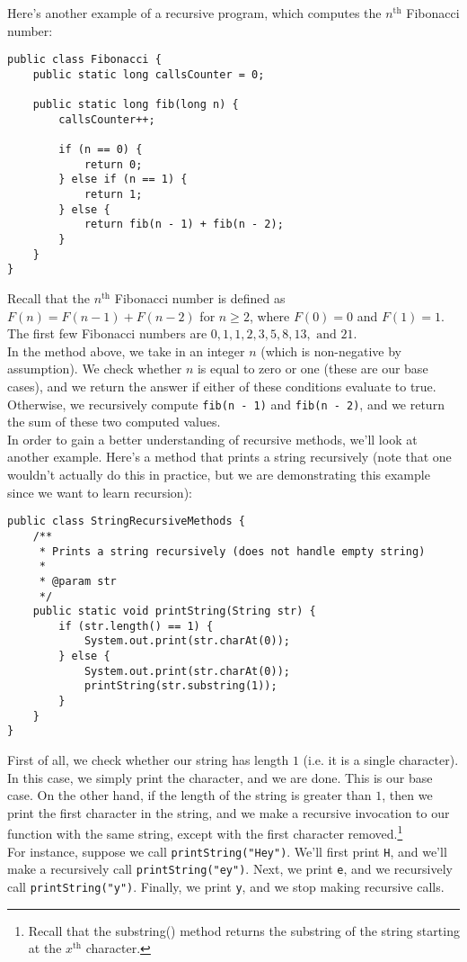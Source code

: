 Here's another example of a recursive program, which computes the $n^{\text{th}}$ Fibonacci number:

\begin{lstlisting}
public class Fibonacci {
	public static long callsCounter = 0;

	public static long fib(long n) {
		callsCounter++;

		if (n == 0) {
			return 0;
		} else if (n == 1) {
			return 1;
		} else {
			return fib(n - 1) + fib(n - 2);
		}
	}
}
\end{lstlisting}

Recall that the $n^{\text{th}}$ Fibonacci number is defined as $F(n) = F(n - 1) + F(n - 2)$ for $n \geq 2$, where $F(0) = 0$ and $F(1) = 1$. The first few Fibonacci numbers are $0, 1, 1, 2, 3, 5, 8, 13, \text{ and } 21$. \\

In the method above, we take in an integer $n$ (which is non-negative by assumption). We check whether $n$ is equal to zero or one (these are our base cases), and we return the answer if either of these conditions evaluate to true. Otherwise, we recursively compute \verb!fib(n - 1)! and \verb!fib(n - 2)!, and we return the sum of these two computed values. \\

In order to gain a better understanding of recursive methods, we'll look at another example. Here's a method that prints a string recursively (note that one wouldn't actually do this in practice, but we are demonstrating this example since we want to learn recursion): 

\begin{lstlisting}
public class StringRecursiveMethods {
	/**
	 * Prints a string recursively (does not handle empty string)
	 * 
	 * @param str
	 */
	public static void printString(String str) {
		if (str.length() == 1) {
			System.out.print(str.charAt(0));
		} else {
			System.out.print(str.charAt(0));
			printString(str.substring(1));
		}
	}
}
\end{lstlisting}

First of all, we check whether our string has length $1$ (i.e. it is a single character). In this case, we simply print the character, and we are done. This is our base case. On the other hand, if the length of the string is greater than $1$, then we print the first character in the string, and we make a recursive invocation to our function with the same string, except with the first character removed.\footnote{Recall that the substring() method returns the substring of the string starting at the $x^{\text{th}}$ character.} \\

For instance, suppose we call \verb!printString("Hey")!. We'll first print \verb!H!, and we'll make a recursively call \verb!printString("ey")!. Next, we print \verb!e!, and we recursively call \verb!printString("y")!. Finally, we print \verb!y!, and we stop making recursive calls.%